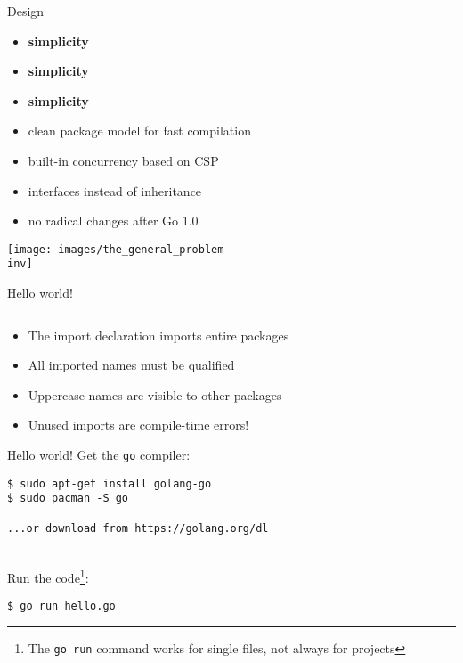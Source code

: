 \documentclass[10pt]{beamer}
\newcommand{\inv}{-inv}
\begin{document}
	
	\begin{frame}{Design}
		\begin{itemize}
			\item \textbf{simplicity}
			\item \textbf{simplicity}
			\item \textbf{simplicity}
			\item clean package model for fast compilation
			\item built-in concurrency based on CSP
			\item interfaces instead of inheritance
			\item no radical changes after Go 1.0
		\end{itemize}
	\end{frame}
	
	
	\begin{frame}
		\begin{center}
			\texttt{[image: images/the\_general\_problem\\inv]}
		\end{center}
	\end{frame}
	
	
	\begin{frame}[t,fragile]{Hello world!}
		\inputminted{go}{code/01_hello.go}
		\vspace*{-4ex}
		\begin{itemize}
			\item The import declaration imports entire packages
			\item All imported names must be qualified
			\item Uppercase names are visible to other packages
			\item Unused imports are compile-time errors!
		\end{itemize}
\end{frame}
	
	
	\begin{frame}[t,fragile]{Hello world!}
		Get the \texttt{go} compiler:
		\begin{verbatim}
$ sudo apt-get install golang-go
$ sudo pacman -S go

...or download from https://golang.org/dl
		\end{verbatim}
		\\
		Run the code\footnote{The \texttt{go run} command works for single files, not always for projects}:
		\begin{verbatim}
$ go run hello.go
		\end{verbatim}
\end{frame}
	
\end{document}
